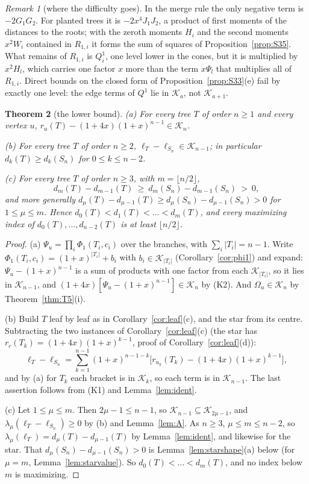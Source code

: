 \documentclass[11pt]{amsart}
\newtheorem{theorem}{Theorem}[section]
\theoremstyle{definition}
\theoremstyle{remark}
\newtheorem{remark}[theorem]{Remark}
\newcommand{\K}{\mathcal K}
\begin{document}
\begin{remark}[where the difficulty goes]\label{rem:difficulty}
In the merge rule the only negative term is $-2G_1G_2$. For planted trees it
is $-2x^4J_1J_2$, a product of first moments of the distances to the roots;
with the zeroth moments $H_i$ and the second moments $x^2W_i$ contained in
$R_{1,i}$ it forms the sum of squares of Proposition~\ref{prop:S35}. What
remains of $R_{1,i}$ is $Q^1_i$, one level lower in the cones, but it is
multiplied by $x^2H_l$, which carries one factor $x$ more than the term
$x\Psi_l$ that multiplies all of $R_{1,i}$. Direct bounds on the closed form
of Proposition~\ref{prop:S33}(e) fail by exactly one level: the edge terms of
$Q^1$ lie in $\K_a$, not $\K_{a+1}$.
\end{remark}

\begin{theorem}[the lower bound]\label{thm:lower}
\textup{(a)} For every tree $T$ of order $n\ge1$ and every vertex $u$,
$r_u(T)-(1+4x)(1+x)^{n-1}\in\K_n$.

\textup{(b)} For every tree $T$ of order $n\ge2$,
$\ell_T-\ell_{S_n}\in\K_{n-1}$; in particular $d_k(T)\ge d_k(S_n)$ for
$0\le k\le n-2$.

\textup{(c)} For every tree $T$ of order $n\ge3$, with $m=\lfloor n/2\rfloor$,
\[
d_m(T)-d_{m-1}(T)\ \ge\ d_m(S_n)-d_{m-1}(S_n)\ >\ 0 ,
\]
and more generally $d_\mu(T)-d_{\mu-1}(T)\ge d_\mu(S_n)-d_{\mu-1}(S_n)>0$
for $1\le\mu\le m$. Hence $d_0(T)<d_1(T)<\dots<d_m(T)$, and every maximizing
index of $d_0(T),\dots,d_{n-2}(T)$ is at least $\lfloor n/2\rfloor$.
\end{theorem}

\begin{proof}
(a) $\Psi_u=\prod_i\Phi_1(T_i,c_i)$ over the branches, with
$\sum_i|T_i|=n-1$. Write $\Phi_1(T_i,c_i)=(1+x)^{|T_i|}+b_i$ with
$b_i\in\K_{|T_i|}$ (Corollary~\ref{cor:phi1}) and expand: $\Psi_u-(1+x)^{n-1}$
is a sum of products with one factor from each $\K_{|T_i|}$, so it lies in
$\K_{n-1}$, and $(1+4x)[\Psi_u-(1+x)^{n-1}]\in\K_n$ by (K2). And
$\Omega_u\in\K_n$ by Theorem~\ref{thm:T5}(i).

(b) Build $T$ leaf by leaf as in Corollary~\ref{cor:leaf}(c), and the star
from its centre. Subtracting the two instances of Corollary~\ref{cor:leaf}(c)
(the star has $r_c(T_k)=(1+4x)(1+x)^{k-1}$, proof of
Corollary~\ref{cor:leaf}(d)):
\[
\ell_T-\ell_{S_n}=\sum_{k=1}^{n-1}(1+x)^{n-1-k}\bigl[r_{u_k}(T_k)-(1+4x)(1+x)^{k-1}\bigr],
\]
and by (a) for $T_k$ each bracket is in $\K_k$, so each term is in
$\K_{n-1}$. The last assertion follows from (K1) and Lemma~\ref{lem:ident}.

(c) Let $1\le\mu\le m$. Then $2\mu-1\le n-1$, so $\K_{n-1}\subseteq\K_{2\mu-1}$,
and $\lambda_\mu(\ell_T-\ell_{S_n})\ge0$ by (b) and Lemma~\ref{lem:A}. As
$n\ge3$, $\mu\le m\le n-2$, so $\lambda_\mu(\ell_T)=d_\mu(T)-d_{\mu-1}(T)$ by
Lemma~\ref{lem:ident}, and likewise for the star. That
$d_\mu(S_n)-d_{\mu-1}(S_n)>0$ is Lemma~\ref{lem:starshape}(a) below (for
$\mu=m$, Lemma~\ref{lem:starvalue}). So $d_0(T)<\dots<d_m(T)$, and no index
below $m$ is maximizing.
\end{proof}
\end{document}
